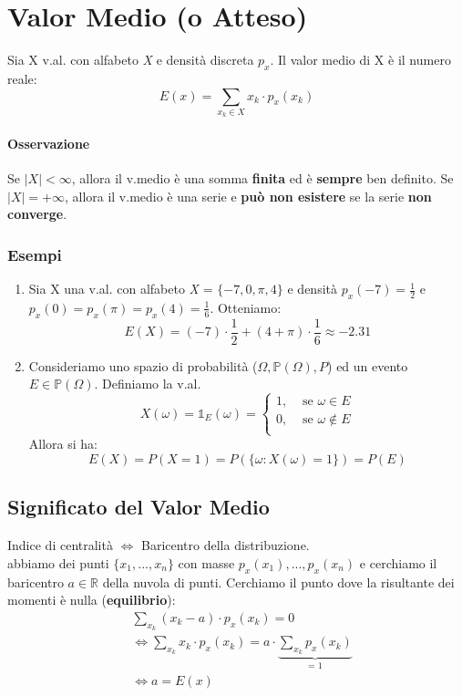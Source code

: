 \documentclass{report}
\begin{document}
\section{Valor Medio (o Atteso)}
Sia X v.al. con alfabeto \textit{X} e densità discreta \(p_x\). Il valor medio di X è il numero reale: 
\[E(x) = \sum_{x_k \in \textit{X}} x_k \cdot p_x(x_k)\]
\paragraph{Osservazione} Se \(|\textit{X}| < \infty\), allora il v.medio è una somma \textbf{finita} ed è \textbf{sempre} ben definito. Se \(|\textit{X}| = +\infty\), allora il v.medio è una serie e \textbf{può non esistere} se la serie \textbf{non converge}.
\subsubsection{Esempi}
\begin{enumerate}
    \item Sia X una v.al. con alfabeto \textit{X} = \(\{-7,0,\pi,4\}\) e densità \(p_x(-7) = \frac{1}{2}\) e \(p_x(0) = p_x(\pi) = p_x(4) = \frac{1}{6}\). Otteniamo:
    \[E(X) = (-7) \cdot \frac{1}{2} + (4+\pi) \cdot \frac{1}{6} \approx -2.31\]
    \item Consideriamo uno spazio di probabilità (\(\Omega, \mathbb{P}(\Omega),P\)) ed un evento \(E \in \mathbb{P}(\Omega)\). Definiamo la v.al.
    \[
    X(\omega) = \mathds{1}_{E}(\omega) = 
    \begin{cases}
    1, & \text{ se } \omega \in E \\
    0, & \text{ se } \omega \notin E \\
    \end{cases}
    \]
    Allora si ha:
    \[E(X) = P(X = 1) = P(\{\omega: X(\omega) = 1\}) = P(E)\]
    \end{enumerate}
\subsection{Significato del Valor Medio}
Indice di centralità \(\Longleftrightarrow\) Baricentro della distribuzione.\\
abbiamo dei punti \(\{x_1,...,x_n\}\) con masse \(p_x(x_1),...,p_x(x_n)\) e cerchiamo il baricentro \(a \in \mathbb{R}\) della nuvola di punti. Cerchiamo il punto dove la risultante dei momenti è nulla (\textbf{equilibrio}):
\begin{align}
  & \sum_{x_k}(x_k - a) \cdot p_x(x_k) = 0\\
  & \Longleftrightarrow \sum_{x_k} x_k \cdot p_x(x_k) = a\cdot \underbrace{\sum_{x_k}p_x(x_k)}_\text{= 1}\\
  & \Longleftrightarrow a = E(x)
\end{align}
\end{document}
